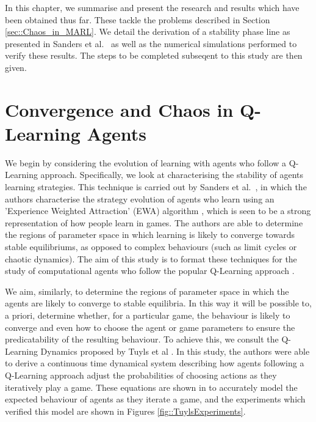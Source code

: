 \documentclass[.../main.tex]{subfiles}
\begin{document}
    In this chapter, we summarise and present the research and results
    which have been obtained thus far. These tackle the problems
    described in Section \ref{sec::Chaos_in_MARL}. We detail the
    derivation of a stability phase line as presented in Sanders et
    al.~\cite{Sanders2018} as well as the numerical simulations
    performed to verify these results. The steps to be completed
    subseqent to this study are then given.


    \section{Convergence and Chaos in Q-Learning Agents} \label{sec::Chaos_in_Q-Learning}

    We begin by considering the evolution of learning with agents who
    follow a Q-Learning approach.  Specifically, we look at
    characterising the stability of agents learning strategies. This
    technique is carried out by Sanders et al.~\cite{Sanders2018}, in
    which the authors characterise the strategy evolution of agents
    who learn using an 'Experience Weighted Attraction' (EWA)
    algorithm \cite{?}, which is seen to be a strong  representation of how
    people learn in games. The authors are able to determine the
    regions of parameter space in which learning is likely to converge
    towards stable equilibriums, as opposed to complex behaviours
    (such as limit cycles or chaotic dynamics). The aim of this study
    is to format these techniques for the study of computational
    agents who follow the popular Q-Learning approach
    \cite{Sutton2018,SchwartzMulti-agentApproach}.

    We aim, similarly, to determine the regions of parameter space in
    which the agents are likely to converge to stable equilibria. In
    this way it will be possible to, a priori, determine whether, for
    a particular game, the behaviour is likely to converge and even
    how to choose the agent or game parameters to ensure the
    predicatability of the resulting behaviour. To achieve this, we
    consult the Q-Learning Dynamics proposed by Tuyls et al
    \cite{Tuyls2006AnGames}. In this study, the authors were able to
    derive a continuous time dynamical system describing how agents
    following a Q-Learning approach adjust the probabilities of
    choosing actions as they iteratively play a game. These equations
    are shown in \cite{Tuyls2006AnGames} to accurately model the
    expected behaviour of agents as they iterate a game, and the
    experiments which verified this model are shown in Figures
    \ref{fig::TuylsExperiments}.
\end{document}
